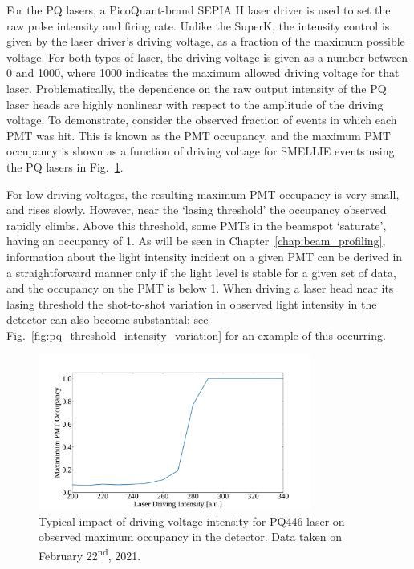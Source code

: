 For the PQ lasers, a PicoQuant-brand SEPIA II laser driver is used to set the raw pulse intensity and firing rate. Unlike the SuperK, the intensity control is given by the laser driver's driving voltage, as a fraction of the maximum possible voltage. For both types of laser, the driving voltage is given as a number between 0 and 1000, where 1000 indicates the maximum allowed driving voltage for that laser. Problematically, the dependence on the raw output intensity of the PQ laser heads are highly nonlinear with respect to the amplitude of the driving voltage. To demonstrate, consider the observed fraction of events in which each PMT was hit. This is known as the PMT occupancy, and the maximum PMT occupancy is shown as a function of driving voltage for SMELLIE events using the PQ lasers in Fig.~\ref{fig:pq_old_intensity_dependence}.

For low driving voltages, the resulting maximum PMT occupancy is very small, and rises slowly. However, near the `lasing threshold' the occupancy observed rapidly climbs. Above this threshold, some PMTs in the beamspot `saturate', having an occupancy of 1. As will be seen in Chapter~\ref{chap:beam_profiling}, information about the light intensity incident on a given PMT can be derived in a straightforward manner only if the light level is stable for a given set of data, and the occupancy on the PMT is below 1. When driving a laser head near its lasing threshold the shot-to-shot variation in observed light intensity in the detector can also become substantial: see Fig.~\ref{fig:pq_threshold_intensity_variation} for an example of this occurring.

\begin{figure}
    \centering
    \includegraphics[width=0.8\textwidth]{3_SMELLIEHardware/images/smellie_intensity_scan_pq446_old.pdf}
    \caption[Typical impact of driving voltage intensity for PQ446 laser on observed maximum occupancy in the detector]
    {Typical impact of driving voltage intensity for PQ446 laser on observed maximum occupancy in the detector. Data taken on February 22\textsuperscript{nd}, 2021.}
    \label{fig:pq_old_intensity_dependence}
\end{figure}

